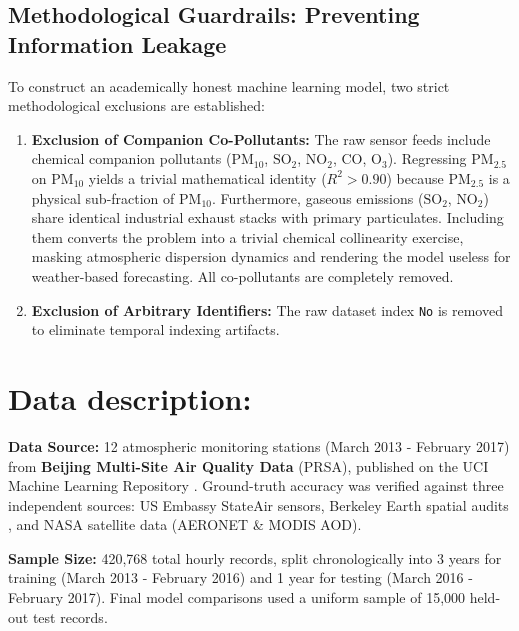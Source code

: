 \documentclass[a4paper,12pt,twocolumn]{article}
\begin{document}
\subsection{Methodological Guardrails: Preventing Information Leakage}
To construct an academically honest machine learning model, two strict methodological exclusions are established:
\begin{enumerate}
    \item \textbf{Exclusion of Companion Co-Pollutants:} The raw sensor feeds include chemical companion pollutants ($\text{PM}_{10}$, $\text{SO}_2$, $\text{NO}_2$, $\text{CO}$, $\text{O}_3$). Regressing $\text{PM}_{2.5}$ on $\text{PM}_{10}$ yields a trivial mathematical identity ($R^2 > 0.90$) because $\text{PM}_{2.5}$ is a physical sub-fraction of $\text{PM}_{10}$. Furthermore, gaseous emissions ($\text{SO}_2$, $\text{NO}_2$) share identical industrial exhaust stacks with primary particulates. Including them converts the problem into a trivial chemical collinearity exercise, masking atmospheric dispersion dynamics and rendering the model useless for weather-based forecasting. All co-pollutants are completely removed.
    \item \textbf{Exclusion of Arbitrary Identifiers:} The raw dataset index \texttt{No} is removed to eliminate temporal indexing artifacts.
\end{enumerate}

\section{Data description:}
\label{sec:data}
\noindent
\textbf{Data Source:} 12 atmospheric monitoring stations (March 2013 - February 2017) from \textbf{Beijing Multi-Site Air Quality Data} (PRSA), published on the UCI Machine Learning Repository \parencite{chen2019beijing}. Ground-truth accuracy was verified against three independent sources: US Embassy StateAir sensors, Berkeley Earth spatial audits \parencite{rohde2015air}, and NASA satellite data (AERONET \& MODIS AOD).

\vspace{1mm}
\noindent
\textbf{Sample Size:} 420,768 total hourly records, split chronologically into 3 years for training (March 2013 - February 2016) and 1 year for testing (March 2016 - February 2017). Final model comparisons used a uniform sample of 15,000 held-out test records.
\end{document}
